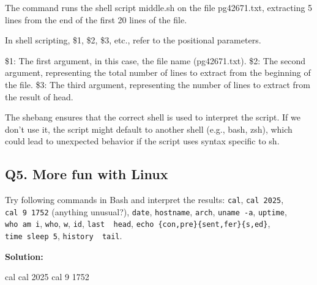 \documentclass[
]{article}
\newenvironment{Shaded}{\begin{snugshade}}{\end{snugshade}}
\newcommand{\FunctionTok}[1]{\textcolor[rgb]{0.28,0.35,0.67}{#1}}
\newcommand{\NormalTok}[1]{\textcolor[rgb]{0.00,0.23,0.31}{#1}}
\begin{document}
The command runs the shell script middle.sh on the file pg42671.txt,
extracting 5 lines from the end of the first 20 lines of the file.

In shell scripting, \$1, \$2, \$3, etc., refer to the positional
parameters.

\$1: The first argument, in this case, the file name (pg42671.txt). \$2:
The second argument, representing the total number of lines to extract
from the beginning of the file. \$3: The third argument, representing
the number of lines to extract from the result of head.

The shebang ensures that the correct shell is used to interpret the
script. If we don't use it, the script might default to another shell
(e.g., bash, zsh), which could lead to unexpected behavior if the script
uses syntax specific to sh.

\hypertarget{q5.-more-fun-with-linux}{%
\subsection{Q5. More fun with Linux}\label{q5.-more-fun-with-linux}}

Try following commands in Bash and interpret the results: \texttt{cal},
\texttt{cal\ 2025}, \texttt{cal\ 9\ 1752} (anything unusual?),
\texttt{date}, \texttt{hostname}, \texttt{arch}, \texttt{uname\ -a},
\texttt{uptime}, \texttt{who\ am\ i}, \texttt{who}, \texttt{w},
\texttt{id}, \texttt{last\ \textbar{}\ head},
\texttt{echo\ \{con,pre\}\{sent,fer\}\{s,ed\}}, \texttt{time\ sleep\ 5},
\texttt{history\ \textbar{}\ tail}.

\textbf{Solution:}

\begin{Shaded}
\begin{Highlighting}[]
\FunctionTok{cal}
\FunctionTok{cal}\NormalTok{ 2025}
\FunctionTok{cal}\NormalTok{ 9 1752}
\end{Highlighting}
\end{Shaded}
\end{document}
